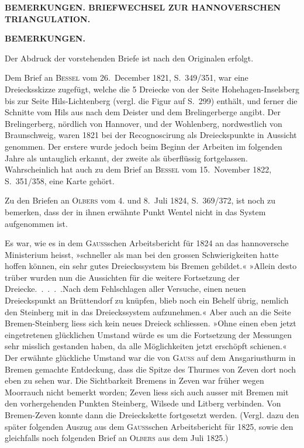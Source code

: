 \par\clearpage
\noindent\null\hfill{\footnotesize\textbf{BEMERKUNGEN. BRIEFWECHSEL ZUR HANNOVERSCHEN TRIANGULATION.}}\hfill{}\par\medskip
\begin{center}\textbf{BEMERKUNGEN.}\end{center}
\begingroup\small
\par\noindent\hspace*{\parindent}Der Abdruck der vorstehenden Briefe ist nach den Originalen erfolgt.
\par\noindent\hspace*{\parindent}Dem Brief an \textsc{Bessel} vom 26.~December 1821, S.~349/351, war eine Dreiecksskizze zugefügt, welche die 5 Dreiecke von der Seite Hohehagen-Inselsberg bis zur Seite Hils-Lichtenberg (vergl. die Figur auf S.~299) enthält, und ferner die Schnitte vom Hils aus nach dem Deister und dem Brelingerberge angibt. Der Brelingerberg, nördlich von Hannover, und der Wohlenberg, nordwestlich von Braunschweig, waren 1821 bei der Recognoscirung als Dreieckspunkte in Aussicht genommen. Der erstere wurde jedoch beim Beginn der Arbeiten im folgenden Jahre als untauglich erkannt, der zweite als überflüssig fortgelassen. Wahrscheinlich hat auch zu dem Brief an \textsc{Bessel} vom 15.~November 1822, S.~351/358, eine Karte gehört.
\par\noindent\hspace*{\parindent}Zu den Briefen an \textsc{Olbers} vom 4. und 8.~Juli 1824, S.~369/372, ist noch zu bemerken, dass der in ihnen erwähnte Punkt Wentel nicht in das System aufgenommen ist.
\par\noindent\hspace*{\parindent}Es war, wie es in dem \textsc{Gauss}schen Arbeitsbericht für 1824 an das hannoversche Ministerium heisst, »schneller als man bei den grossen Schwierigkeiten hatte hoffen können, ein sehr gutes Dreieckssystem bis Bremen gebildet.« »Allein desto trüber wurden nun die Aussichten für die weitere Fortsetzung der Dreiecke.\ \mbox{.\ .\ .\ .}\quad Nach dem Fehlschlagen aller Versuche, einen neuen Dreieckspunkt an Brüttendorf zu knüpfen, blieb noch ein Behelf übrig, nemlich den Steinberg mit in das Dreieckssystem aufzunehmen.« Aber auch an die Seite Bremen-Steinberg liess sich kein neues Dreieck schliessen. »Ohne einen eben jetzt eingetretenen glücklichen Umstand würde es um die Fortsetzung der Messungen sehr misslich gestanden haben, da alle Möglichkeiten jetzt erschöpft schienen.« Der erwähnte glückliche Umstand war die von \textsc{Gauss} auf dem Ansgariusthurm in Bremen gemachte Entdeckung, dass die Spitze des Thurmes von Zeven dort noch eben zu sehen war. Die Sichtbarkeit Bremens in Zeven war früher wegen Moorrauch nicht bemerkt worden; Zeven liess sich auch ausser mit Bremen mit den vorhergehenden Punkten Steinberg, Wilsede und Litberg verbinden. Von Bremen-Zeven konnte dann die Dreieckskette fortgesetzt werden. (Vergl. dazu den später folgenden Auszug aus dem \textsc{Gauss}schen Arbeitsbericht für 1825, sowie den gleichfalls noch folgenden Brief an \textsc{Olbers} aus dem Juli 1825.)
